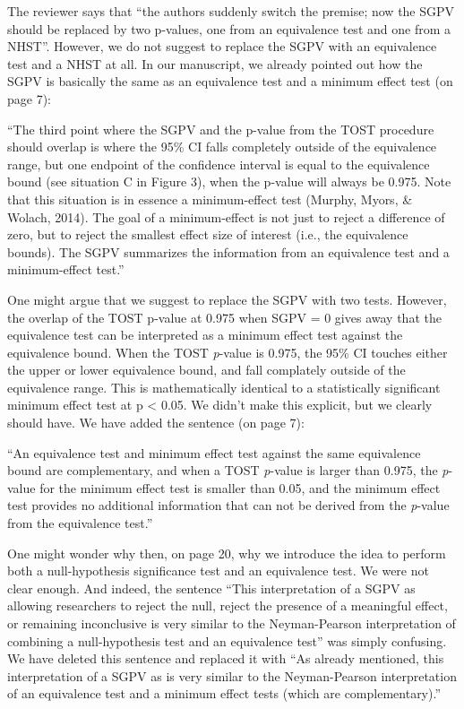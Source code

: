 \documentclass[man]{apa6}
\begin{document}
The reviewer says that \enquote{the authors suddenly switch the premise;
now the SGPV should be replaced by two p-values, one from an equivalence
test and one from a NHST}. However, we do not suggest to replace the
SGPV with an equivalence test and a NHST at all. In our manuscript, we
already pointed out how the SGPV is basically the same as an equivalence
test and a minimum effect test (on page 7):

\enquote{The third point where the SGPV and the p-value from the TOST
procedure should overlap is where the 95\% CI falls completely outside
of the equivalence range, but one endpoint of the confidence interval is
equal to the equivalence bound (see situation C in Figure 3), when the
p-value will always be 0.975. Note that this situation is in essence a
minimum-effect test (Murphy, Myors, \& Wolach, 2014). The goal of a
minimum-effect is not just to reject a difference of zero, but to reject
the smallest effect size of interest (i.e., the equivalence bounds). The
SGPV summarizes the information from an equivalence test and a
minimum-effect test.}

One might argue that we suggest to replace the SGPV with two tests.
However, the overlap of the TOST p-value at 0.975 when SGPV = 0 gives
away that the equivalence test can be interpreted as a minimum effect
test against the equivalence bound. When the TOST \emph{p}-value is
0.975, the 95\% CI touches either the upper or lower equivalence bound,
and fall complately outside of the equivalence range. This is
mathematically identical to a statistically significant minimum effect
test at p \textless{} 0.05. We didn't make this explicit, but we clearly
should have. We have added the sentence (on page 7):

\enquote{An equivalence test and minimum effect test against the same
equivalence bound are complementary, and when a TOST \emph{p}-value is
larger than 0.975, the \emph{p}-value for the minimum effect test is
smaller than 0.05, and the minimum effect test provides no additional
information that can not be derived from the \emph{p}-value from the
equivalence test.}

One might wonder why then, on page 20, why we introduce the idea to
perform both a null-hypothesis significance test and an equivalence
test. We were not clear enough. And indeed, the sentence \enquote{This
interpretation of a SGPV as allowing researchers to reject the null,
reject the presence of a meaningful effect, or remaining inconclusive is
very similar to the Neyman-Pearson interpretation of combining a
null-hypothesis test and an equivalence test} was simply confusing. We
have deleted this sentence and replaced it with \enquote{As already
mentioned, this interpretation of a SGPV as is very similar to the
Neyman-Pearson interpretation of an equivalence test and a minimum
effect tests (which are complementary).}
\end{document}
